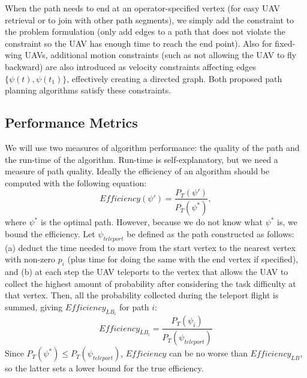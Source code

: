 \documentclass[journal]{IEEEtran}
\begin{document}
When the path needs to end at an operator-specified vertex (for easy UAV retrieval or to join with other path segments), we simply add the constraint to the problem formulation (only add edges to a path that does not violate the constraint so the UAV has enough time to reach the end point). Also for fixed-wing UAVs, additional motion constraints (such as not allowing the UAV to fly backward) are also introduced as velocity constraints affecting edges $\{\psi(t), \psi(t_1)\}$, effectively creating a directed graph. Both proposed path planning algorithms satisfy these constraints.

\subsection{Performance Metrics}

We will use two measures of algorithm performance: the quality of the path and the run-time of the algorithm. Run-time is self-explanatory, but we need a measure of path quality. Ideally the efficiency of an algorithm should be computed with the following equation:
\begin{equation}
\mathit{Efficiency}(\psi') = \frac{P_T(\psi')}{P_T(\psi^*)},
\label{Efficiency}
\end{equation}
where $\psi^*$ is the optimal path. However, because we do not know what $\psi^*$ is, we bound the efficiency. Let $\psi_{teleport}$ be defined as the path constructed as follows: (a) deduct the time needed to move from the start vertex to the nearest vertex with non-zero $p_i$ (plus time for doing the same with the end vertex if specified), and (b) at each step the UAV teleports to the vertex that allows the UAV to collect the highest amount of probability after considering the task difficulty at that vertex. Then, all the probability collected during the teleport flight is summed, giving $\mathit{Efficiency_{LB_i}}$ for path $i$:
\begin{equation}
\mathit{Efficiency_{LB_i}} = \frac{P_T(\psi_i)}{P_T(\psi_{teleport})}
\label{EfficiencyLB}
\end{equation}
Since $P_T(\psi^*) \leq P_T(\psi_{teleport})$, $\mathit{Efficiency}$ can be no worse than $\mathit{Efficiency_{LB}}$, so the latter sets a lower bound for the true efficiency.

\end{document}

